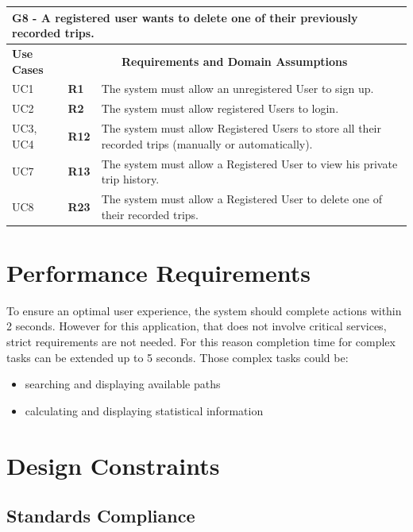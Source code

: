 \begin{longtable}{|p{2.5cm}|p{1cm}|p{10.5cm}|}
\hline
\multicolumn{3}{|p{14.5cm}|}{\centering \textbf{G8 - A registered user wants to delete one of their previously recorded trips.}} \\
\hline
\textbf{Use Cases} & \multicolumn{2}{c|}{\textbf{Requirements and Domain Assumptions}} \\
\hline
UC1 & \textbf{R1} & The system must allow an unregistered User to sign up. \\
\hline
UC2 & \textbf{R2} & The system must allow registered Users to login. \\
\hline
UC3, UC4 & \textbf{R12} & The system must allow Registered Users to store all their recorded trips (manually or automatically). \\
\hline
UC7 & \textbf{R13} & The system must allow a Registered User to view his private trip history. \\
\hline
UC8 & \textbf{R23} & The system must allow a Registered User to delete one of their recorded trips.\\
\hline
\end{longtable}


\section{Performance Requirements}
\label{sec:performance}

To ensure an optimal user experience, the system should complete actions within 2 seconds. However for this application, that does not involve critical services, strict requirements are not needed. For this reason completion time for complex tasks can be extended up to 5 seconds. Those complex tasks could be:

\begin{itemize}
    \item searching and displaying available paths
    \item calculating and displaying statistical information
\end{itemize}

\section{Design Constraints}
\label{sec:constraints}

\subsection{Standards Compliance}

